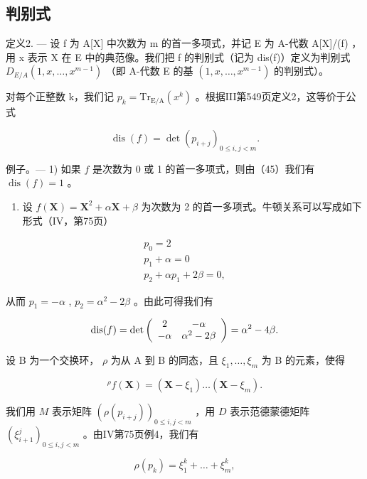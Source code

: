 \subsection{判别式}

定义2. --- 设 f 为 A{[}X{]} 中次数为 m 的首一多项式，并记 E 为 A-代数 A{[}X{]}/(f) ，用 x 表示 X 在 E 中的典范像。我们把 f 的判别式（记为 dis(f)）定义为判别式 \(D_{E/A}(1, x, \ldots, x^{m-1})\) （即 A-代数 E 的基 \((1, x, \ldots, x^{m-1})\) 的判别式）。

对每个正整数 k，我们记 \(p_{k} = \mathrm{Tr}_{\mathrm{E}/\mathrm{A}}(x^{k})\) 。根据III第549页定义2，这等价于公式

\[
\operatorname{dis} (f) = \det \left(p _ {i + j}\right) _ {0 \leqslant i, j <   m}.\tag{45}
\]

例子。--- 1) 如果 \(f\) 是次数为 0 或 1 的首一多项式，则由（45）我们有 \(\operatorname{dis}(f) = 1\) 。

\begin{enumerate}
\def\labelenumi{\arabic{enumi})}
\setcounter{enumi}{1}
\tightlist
\item
  设 \(f(\mathbf{X}) = \mathbf{X}^2 + \alpha \mathbf{X} + \beta\) 为次数为 2 的首一多项式。牛顿关系可以写成如下形式（IV，第75页）
\end{enumerate}

\[
\begin{array}{c} p _ {0} = 2 \\ p _ {1} + \alpha = 0 \\ p _ {2} + \alpha p _ {1} + 2 \beta = 0, \end{array}
\]

从而 \(p_1 = -\alpha\) , \(p_2 = \alpha^2 - 2\beta\) 。由此可得我们有

\[
\operatorname{dis} (f) = \det \left( \begin{array}{c c} 2 & - \alpha \\ - \alpha & \alpha^ {2} - 2 \beta \end{array} \right) = \alpha^ {2} - 4 \beta .
\]

设 B 为一个交换环， \(\rho\) 为从 A 到 B 的同态，且 \(\xi_{1}, \ldots, \xi_{m}\) 为 B 的元素，使得

\[
{ } ^ { \rho } f ( \mathbf { X } ) = ( \mathbf { X } - \xi _ { 1 } ) \dots ( \mathbf { X } - \xi _ { m } ) .
\]

我们用 \(M\) 表示矩阵 \((\rho(p_{i+j}))_{0 \leqslant i,j < m}\) ，用 \(D\) 表示范德蒙德矩阵 \((\xi_{i+1}^{j})_{0 \leqslant i,j < m}\) 。由IV第75页例4，我们有

\[
\rho (p _ {k}) = \xi_ {1} ^ {k} + \dots + \xi_ {m} ^ {k},
\]

